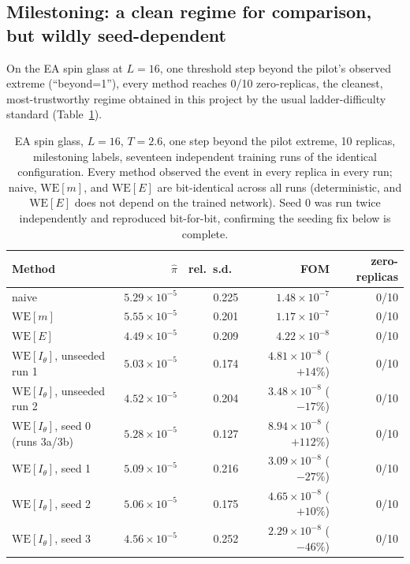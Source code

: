 \documentclass[a4paper,fleqn]{cas-sc}
\begin{document}
\subsection{Milestoning: a clean regime for comparison, but wildly seed-dependent}\label{sec:milestone}
On the EA spin glass at $L=16$, one threshold step beyond the pilot's observed extreme
(``beyond=1''), every method reaches 0/10 zero-replicas, the cleanest,
most-trustworthy regime obtained in this project by the usual ladder-difficulty standard
(Table~\ref{tab:milestone}).

\begin{table}[H]
\centering\small
\caption{EA spin glass, $L=16$, $T=2.6$, one step beyond the pilot extreme, 10 replicas,
	milestoning labels, seventeen independent training runs of the identical configuration.
	Every method observed the event in every replica in every run; naive,
	$\mathrm{WE}[m]$, and $\mathrm{WE}[E]$ are bit-identical across all runs (deterministic,
	and $\mathrm{WE}[E]$ does not depend on the trained network). Seed 0 was run twice
	independently and reproduced bit-for-bit, confirming the seeding fix below is
	complete.}
\label{tab:milestone}
\begin{tabular}{lrrrr}
	\toprule
	Method & $\hat\pi$ & rel.\ s.d.\ & FOM & zero-replicas \\
	\midrule
	naive & $5.29\times10^{-5}$ & 0.225 & $1.48\times10^{-7}$ & 0/10 \\
	$\mathrm{WE}[m]$ & $5.55\times10^{-5}$ & 0.201 & $1.17\times10^{-7}$ & 0/10 \\
	$\mathrm{WE}[E]$ & $4.49\times10^{-5}$ & 0.209 & $4.22\times10^{-8}$ & 0/10 \\
	$\mathrm{WE}[I_\theta]$, unseeded run 1 & $5.03\times10^{-5}$ & 0.174 &
	$4.81\times10^{-8}$ ($+14\%$) & 0/10 \\
	$\mathrm{WE}[I_\theta]$, unseeded run 2 & $4.52\times10^{-5}$ & 0.204 &
	$3.48\times10^{-8}$ ($-17\%$) & 0/10 \\
	$\mathrm{WE}[I_\theta]$, seed 0 (runs 3a/3b) & $5.28\times10^{-5}$ & 0.127 &
	$8.94\times10^{-8}$ ($+112\%$) & 0/10 \\
	$\mathrm{WE}[I_\theta]$, seed 1 & $5.09\times10^{-5}$ & 0.216 &
	$3.09\times10^{-8}$ ($-27\%$) & 0/10 \\
	$\mathrm{WE}[I_\theta]$, seed 2 & $5.06\times10^{-5}$ & 0.175 &
	$4.65\times10^{-8}$ ($+10\%$) & 0/10 \\
	$\mathrm{WE}[I_\theta]$, seed 3 & $4.56\times10^{-5}$ & 0.252 &
	$2.29\times10^{-8}$ ($-46\%$) & 0/10 \\

\end{tabular}
\end{table}
\end{document}
